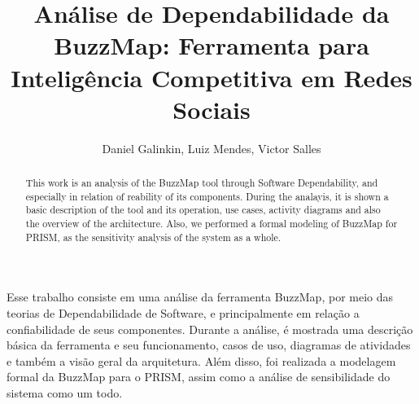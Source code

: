 \documentclass[12pt]{article}
\title{Análise de Dependabilidade da BuzzMap: Ferramenta para Inteligência
Competitiva em Redes Sociais}
\author{Daniel Galinkin\inst{1}, Luiz Mendes\inst{1}, Victor Salles\inst{1}}
\begin{document}
 

\maketitle

\begin{abstract}
 This work is an analysis of the BuzzMap tool through Software Dependability,
 and especially in relation of reability of its components. During the
 analayis, it is shown a basic description of the tool and its operation, use
 cases, activity diagrams and also the overview of the architecture. Also,
 we performed a formal modeling of BuzzMap for PRISM, as the sensitivity
 analysis of the system as a whole.
\end{abstract}
     
\begin{resumo} 
  Esse trabalho consiste em uma análise da ferramenta BuzzMap, por
  meio das teorias de Dependabilidade de Software, e principalmente em relação
  a confiabilidade de seus componentes. Durante a análise, é mostrada uma
  descrição básica da ferramenta e seu funcionamento, casos de uso, diagramas
  de atividades e também a visão geral da arquitetura. Além
  disso, foi realizada a modelagem formal da BuzzMap para o PRISM, assim como
  a análise de sensibilidade do sistema como um todo.
\end{resumo}











\nocite{*}


\end{document}

